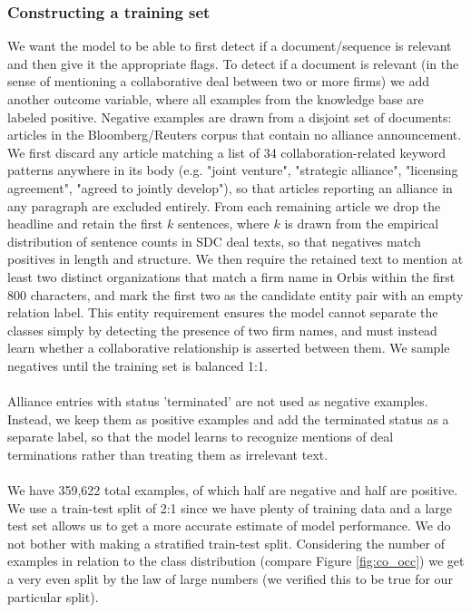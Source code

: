 \subsubsection{Constructing a training set}
We want the model to be able to first detect if a document/sequence is relevant and then give it the appropriate flags. To detect if a document is relevant (in the sense of mentioning a collaborative deal between two or more firms) we add another outcome variable, where all examples from the knowledge base are labeled positive. Negative examples are drawn from a disjoint set of documents: articles in the Bloomberg/Reuters corpus that contain no alliance announcement. We first discard any article matching a list of 34 collaboration-related keyword patterns anywhere in its body (e.g. "joint venture", "strategic alliance", "licensing agreement", "agreed to jointly develop"), so that articles reporting an alliance in any paragraph are excluded entirely. From each remaining article we drop the headline and retain the first $k$ sentences, where $k$ is drawn from the empirical distribution of sentence counts in SDC deal texts, so that negatives match positives in length and structure. We then require the retained text to mention at least two distinct organizations that match a firm name in Orbis within the first 800 characters, and mark the first two as the candidate entity pair with an empty relation label. This entity requirement ensures the model cannot separate the classes simply by detecting the presence of two firm names, and must instead learn whether a collaborative relationship is asserted between them. We sample negatives until the training set is balanced 1:1. \\\\
Alliance entries with status 'terminated' are not used as negative examples. Instead, we keep them as positive examples and add the terminated status as a separate label, so that the model learns to recognize mentions of deal terminations rather than treating them as irrelevant text. \\\\
We have 359,622 total examples, of which half are negative and half are positive. We use a train-test split of 2:1 since we have plenty of training data and a large test set allows us to get a more accurate estimate of model performance. We do not bother with making a stratified train-test split. Considering the number of examples in relation to the class distribution (compare Figure \ref{fig:co_occ}) we get a very even split by the law of large numbers (we verified this to be true for our particular split).

